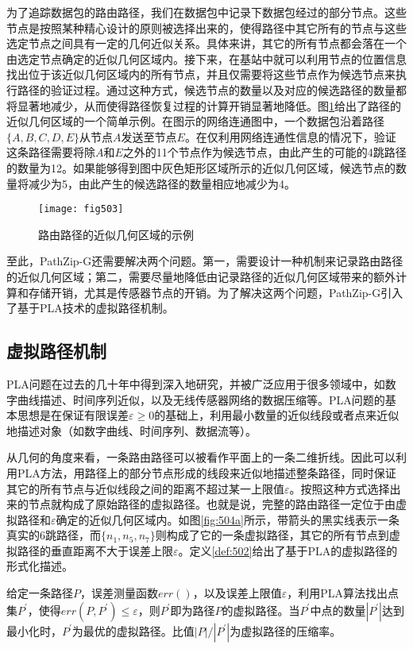 为了追踪数据包的路由路径，我们在数据包中记录下数据包经过的部分节点。这些节点是按照某种精心设计的原则被选择出来的，使得路径中其它所有的节点与这些选定节点之间具有一定的几何近似关系。具体来讲，其它的所有节点都会落在一个由选定节点确定的近似几何区域内。接下来，在基站中就可以利用节点的位置信息找出位于该近似几何区域内的所有节点，并且仅需要将这些节点作为候选节点来执行路径的验证过程。通过这种方式，候选节点的数量以及对应的候选路径的数量都将显著地减少，从而使得路径恢复过程的计算开销显著地降低。图\ref{fig:503}给出了路径的近似几何区域的一个简单示例。在图示的网络连通图中，一个数据包沿着路径$\{A,B,C,D,E\}$从节点$A$发送至节点$E$。在仅利用网络连通性信息的情况下，验证这条路径需要将除$A$和$E$之外的11个节点作为候选节点，由此产生的可能的4跳路径的数量为12。如果能够得到图中灰色矩形区域所示的近似几何区域，候选节点的数量将减少为5，由此产生的候选路径的数量相应地减少为4。
\begin{figure}[h]
\centering
\texttt{[image: fig503]}
\caption{路由路径的近似几何区域的示例}
\label{fig:503}
\end{figure}

至此，PathZip-G还需要解决两个问题。第一，需要设计一种机制来记录路由路径的近似几何区域；第二，需要尽量地降低由记录路径的近似几何区域带来的额外计算和存储开销，尤其是传感器节点的开销。为了解决这两个问题，PathZip-G引入了基于PLA技术的虚拟路径机制。
\subsection{虚拟路径机制}
PLA问题在过去的几十年中得到深入地研究，并被广泛应用于很多领域中，如数字曲线描述、时间序列近似，以及无线传感器网络的数据压缩等。PLA问题的基本思想是在保证有限误差$\varepsilon\geq0$的基础上，利用最小数量的近似线段或者点来近似地描述对象（如数字曲线、时间序列、数据流等）。

从几何的角度来看，一条路由路径可以被看作平面上的一条二维折线。因此可以利用PLA方法，用路径上的部分节点形成的线段来近似地描述整条路径，同时保证其它的所有节点与近似线段之间的距离不超过某一上限值$\varepsilon$。按照这种方式选择出来的节点就构成了原始路径的虚拟路径。也就是说，完整的路由路径一定位于由虚拟路径和$\varepsilon$确定的近似几何区域内。如图\ref{fig:504a}所示，带箭头的黑实线表示一条真实的6跳路径，而${\{n_1,n_5,n_7\}}$则构成了它的一条虚拟路径，其它的所有节点到虚拟路径的垂直距离不大于误差上限$\varepsilon$。定义\ref{def:502}给出了基于PLA的虚拟路径的形式化描述。
\begin{definition}\label{def:502}
给定一条路径$P$，误差测量函数$err()$，以及误差上限值$\varepsilon$，利用PLA算法找出点集$P^{'}$，使得$err(P,P^{'})\leq\varepsilon$，则$P^{'}$即为路径$P$的虚拟路径。当$P^{'}$中点的数量$|P^{'}|$达到最小化时，$P^{'}$为最优的虚拟路径。比值$|P|/|P^{'}|$为虚拟路径的压缩率。
\end{definition}
